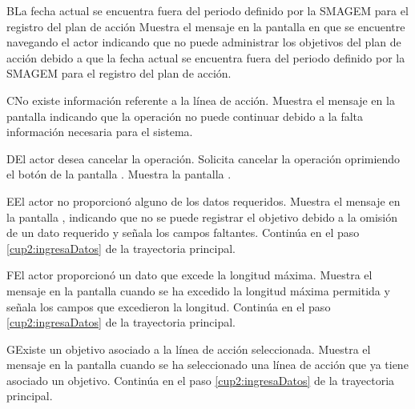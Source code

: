    \begin{UCtrayectoriaA}{B}{La fecha actual se encuentra fuera del periodo definido por la SMAGEM para el registro del plan de acción}
    \UCpaso[\UCsist] Muestra el mensaje  en la pantalla en que se encuentre navegando el actor indicando que no puede administrar los objetivos del plan de acción debido a que la fecha actual se encuentra fuera del periodo definido por la SMAGEM para el registro del plan de acción.
 \end{UCtrayectoriaA}
 
\begin{UCtrayectoriaA}{C}{No existe información referente a la línea de acción.}
	\UCpaso[\UCsist] Muestra el mensaje   en la pantalla  indicando que la operación no puede continuar debido a la falta información necesaria para el sistema.
\end{UCtrayectoriaA}
  
\begin{UCtrayectoriaA}{D}{El actor desea cancelar la operación.}
	\UCpaso[\UCactor] Solicita cancelar la operación oprimiendo el botón  de la pantalla .
	\UCpaso[\UCsist] Muestra la pantalla  .
\end{UCtrayectoriaA} 

\begin{UCtrayectoriaA}{E}{El actor no proporcionó alguno de los datos requeridos.}
	\UCpaso[\UCsist] Muestra el mensaje  en la pantalla  ,
	indicando que no se puede registrar el objetivo debido a la omisión de un dato requerido y señala los campos faltantes.
	\UCpaso[] Continúa en el paso \ref{cup2:ingresaDatos} de la trayectoria principal.
\end{UCtrayectoriaA}
 
\begin{UCtrayectoriaA}{F}{El actor proporcionó un dato que excede la longitud máxima.}
	\UCpaso[\UCsist] Muestra el mensaje  en la pantalla 
	cuando se ha excedido la longitud máxima permitida y señala los campos que excedieron la longitud.
	\UCpaso[] Continúa en el paso \ref{cup2:ingresaDatos} de la trayectoria principal.
\end{UCtrayectoriaA}

\begin{UCtrayectoriaA}{G}{Existe un objetivo asociado a la línea de acción seleccionada.}
	\UCpaso[\UCsist] Muestra el mensaje  en la pantalla 
	cuando se ha seleccionado una línea de acción que ya tiene asociado un objetivo.
	\UCpaso[] Continúa en el paso \ref{cup2:ingresaDatos} de la trayectoria principal.
\end{UCtrayectoriaA}